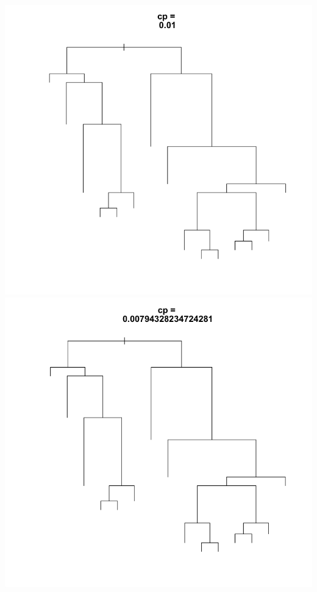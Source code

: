 \documentclass[11pt]{article}
\begin{document}
\begin{center}
\includegraphics[scale=0.25]{images/ctrl1}
\includegraphics[scale=0.25]{images/ctrl2}

\end{center}
\end{document}

